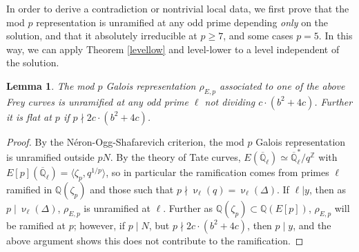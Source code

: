 \documentclass[12pt]{amsart}
\newtheorem{lem}[thm]{Lemma}
\theoremstyle{definition}
\def\Q{{\mathbb Q}}
\def\Z{{\mathbb Z}}
\renewcommand{\bar}{\overline}
\newcommand{\notdiv}{\nmid}
\begin{document}
In order to derive a contradiction or nontrivial local data, we first prove that the mod $p$ representation is unramified at any odd prime depending \emph{only} on the solution, and that it absolutely irreducible at $p \geq 7$, and some cases $p=5$.  In this way, we can apply Theorem \ref{levellow} and level-lower to a level independent of the solution.  


\begin{lem}\label{unram}
The mod $p$ Galois representation $\rho_{E,p}$ associated to one of the above Frey curves is unramified at any odd prime $\ell$ not dividing $c \cdot (b^2+4c)$.  Further it is flat at $p$ if $p \notdiv 2c\cdot (b^2+4c)$.
\end{lem}
\begin{proof}
By the N\'{e}ron-Ogg-Shafarevich criterion, the mod $p$ Galois representation is unramified outside $pN$.  By the theory of Tate curves, $E(\bar{\Q}_\ell) \simeq \bar{\Q}_\ell^\ast / q^{\Z}$ with $E[p](\bar{\Q}_\ell) = \langle \zeta_p, q^{1/p} \rangle$, so in particular the ramification comes from primes $\ell$ ramified in $\Q(\zeta_p)$ and those such that $p \notdiv \upnu_\ell(q) = \upnu_\ell(\Delta)$.  If $\ell | y$, then as $p \mid \upnu_\ell(\Delta)$, $\rho_{E,p}$ is unramified at $\ell$.  Further as $\Q(\zeta_p) \subset \Q(E[p])$, $\rho_{E,p}$ will be ramified at $p$; however, if $p \mid N$, but $p \notdiv 2c \cdot (b^2+4c)$, then $p \mid y$, and the above argument shows this does not contribute to the ramification.
\end{proof}
\end{document}
